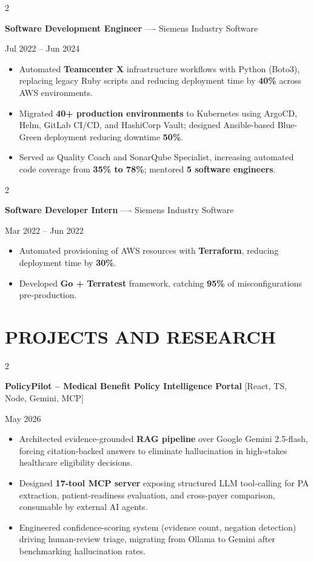 \documentclass[10pt, letterpaper]{article}
\newenvironment{highlights}{
    \begin{itemize}[
        topsep=0.10 cm,
        parsep=0.06 cm,
        partopsep=0pt,
        itemsep=0.06 cm,
        leftmargin=12pt
    ]
}{
    \end{itemize}
}
\newenvironment{twocolentry}[2][]{
    \onecolentry
    \def\secondColumn{#2}
    \setcolumnwidth{\fill, 4.5 cm}
    \begin{paracol}{2}
}{
    \switchcolumn \raggedleft \secondColumn
    \end{paracol}
    \endonecolentry
}
\begin{document}
\vspace{0.15 cm}

\begin{twocolentry}{Jul 2022 -- Jun 2024}
\textbf{Software Development Engineer} ---- Siemens Industry Software
\end{twocolentry}
\begin{highlights}
  \item Automated \textbf{Teamcenter X} infrastructure workflows with Python (Boto3), replacing legacy Ruby scripts and reducing deployment time by \textbf{40\%} across AWS environments.
  \item Migrated \textbf{40+ production environments} to Kubernetes using ArgoCD, Helm, GitLab CI/CD, and HashiCorp Vault; designed Ansible-based Blue-Green deployment reducing downtime \textbf{50\%}.
  \item Served as Quality Coach and SonarQube Specialist, increasing automated code coverage from \textbf{35\% to 78\%}; mentored \textbf{5 software engineers}.
\end{highlights}

\vspace{0.15 cm}

\begin{twocolentry}{Mar 2022 -- Jun 2022}
\textbf{Software Developer Intern} ---- Siemens Industry Software
\end{twocolentry}
\begin{highlights}
  \item Automated provisioning of AWS resources with \textbf{Terraform}, reducing deployment time by \textbf{30\%}.
  \item Developed \textbf{Go + Terratest} framework, catching \textbf{95\%} of misconfigurations pre-production.
\end{highlights}

\section{PROJECTS AND RESEARCH}
\begin{twocolentry}{May 2026}
\textbf{PolicyPilot -- Medical Benefit Policy Intelligence Portal} [React, TS, Node, Gemini, MCP]
\end{twocolentry}
\begin{highlights}
  \item Architected evidence-grounded \textbf{RAG pipeline} over Google Gemini 2.5-flash, forcing citation-backed answers to eliminate hallucination in high-stakes healthcare eligibility decisions.
  \item Designed \textbf{17-tool MCP server} exposing structured LLM tool-calling for PA extraction, patient-readiness evaluation, and cross-payer comparison, consumable by external AI agents.
  \item Engineered confidence-scoring system (evidence count, negation detection) driving human-review triage, migrating from Ollama to Gemini after benchmarking hallucination rates.
\end{highlights}
\end{document}
